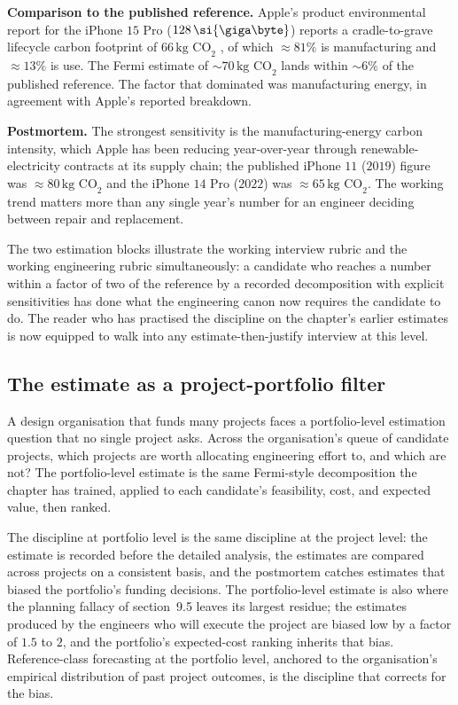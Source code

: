 \begin{estimation}
\textbf{Comparison to the published reference.} Apple's
product environmental report for the iPhone $15$ Pro
($128 \,\si{\giga\byte}$) reports a cradle-to-grave lifecycle
carbon footprint of $66 \,\text{kg CO}_{2}$
\cite{web:ch09t3b-apple-iphone15-2023}, of which $\approx 81\%$
is manufacturing and $\approx 13\%$ is use. The Fermi estimate
of $\sim 70 \,\text{kg CO}_{2}$ lands within $\sim 6\%$
of the published reference. The factor that dominated was
manufacturing energy, in agreement with Apple's reported
breakdown.

\textbf{Postmortem.} The strongest sensitivity is the
manufacturing-energy carbon intensity, which Apple has been
reducing year-over-year through renewable-electricity contracts
at its supply chain; the published iPhone $11$ ($2019$) figure
was $\approx 80 \,\text{kg CO}_{2}$ and the iPhone $14$
Pro ($2022$) was $\approx 65 \,\text{kg CO}_{2}$. The
working trend matters more than any single year's number for an
engineer deciding between repair and replacement.
\end{estimation}

The two estimation blocks illustrate the working interview
rubric and the working engineering rubric simultaneously: a
candidate who reaches a number within a factor of two of the
reference by a recorded decomposition with explicit sensitivities
has done what the engineering canon now requires the candidate
to do. The reader who has practised the discipline on the
chapter's earlier estimates is now equipped to walk into any
estimate-then-justify interview at this level.

\subsection{The estimate as a project-portfolio filter}

A design organisation that funds many projects faces a
portfolio-level estimation question that no single project
asks. Across the organisation's queue of candidate projects,
which projects are worth allocating engineering effort to, and
which are not? The portfolio-level estimate is the same
Fermi-style decomposition the chapter has trained, applied to
each candidate's feasibility, cost, and expected value, then
ranked.

The discipline at portfolio level is the same discipline at the
project level: the estimate is recorded before the detailed
analysis, the estimates are compared across projects on a
consistent basis, and the postmortem catches estimates that
biased the portfolio's funding decisions. The portfolio-level
estimate is also where the planning fallacy of
section~9.5 leaves its largest residue; the estimates produced
by the engineers who will execute the project are biased low
by a factor of $1.5$ to $2$, and the portfolio's expected-cost
ranking inherits that bias. Reference-class forecasting at the
portfolio level, anchored to the organisation's empirical
distribution of past project outcomes, is the discipline that
corrects for the bias.

